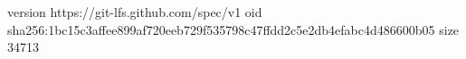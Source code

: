 version https://git-lfs.github.com/spec/v1
oid sha256:1bc15c3affee899af720eeb729f535798c47ffdd2c5e2db4efabc4d486600b05
size 34713
